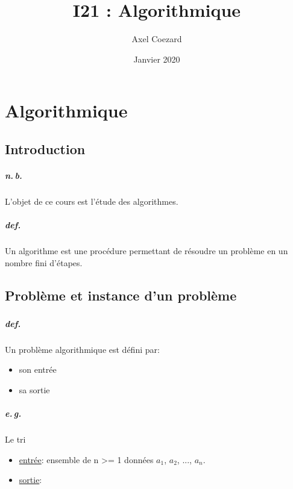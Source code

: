 \documentclass{report}
\title{I21 : Algorithmique}
\author{Axel Coezard}
\date{Janvier 2020}
\begin{document}
\maketitle
\newpage

\tableofcontents
\newpage

\chapter{Algorithmique}

\setcounter{section}{-1}
\setcounter{algorithm}{0}

\section{Introduction}

  \paragraph{n.\,b.} L'objet de ce cours est l'étude des algorithmes.

  \paragraph{def.} Un algorithme est une procédure permettant de résoudre un problème en un nombre fini d'étapes.

\section{Problème et instance d'un problème}

  \subsection{}

  \paragraph{def.} Un problème algorithmique est défini par:
  \begin{itemize}
    \item son entrée
    \item sa sortie
  \end{itemize}

  \paragraph{e.\,g.} Le tri
  \begin{itemize}
    \item \underline{entrée}: ensemble de n >=  1 données $a_{1}$, $a_{2}$, ..., $a_{n}$.
    \item \underline{sortie}:
  \end{itemize}
\end{document}
